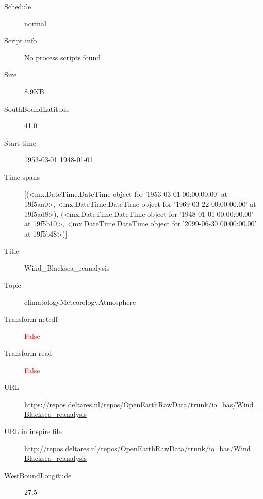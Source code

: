 \documentclass[9]{report}
\begin{document}
\begin{description}
\begin{verbatim}
\end{verbatim}
  \item[Schedule] normal
  \item[Script info] No process scripts found
  \item[Size] 8.9KB
  \item[SouthBoundLatitude] 41.0
  \item[Start time] 1953-03-01 1948-01-01
  \item[Time spans] [(<mx.DateTime.DateTime object for '1953-03-01 00:00:00.00' at 19f5aa0>, <mx.DateTime.DateTime object for '1969-03-22 00:00:00.00' at 19f5ad8>), (<mx.DateTime.DateTime object for '1948-01-01 00:00:00.00' at 19f5b10>, <mx.DateTime.DateTime object for '2099-06-30 00:00:00.00' at 19f5b48>)]
  \item[Title]  Wind\_Blacksea\_reanalysis 
  \item[Topic] climatologyMeteorologyAtmosphere
  \item[Transform netcdf] \textcolor{red}{False}
  \item[Transform read] \textcolor{red}{False}
  \item[URL] \href{https://repos.deltares.nl/repos/OpenEarthRawData/trunk/io\_bas/Wind\_Blacksea\_reanalysis}{https://repos.deltares.nl/repos/OpenEarthRawData/trunk/io\_bas/Wind\_Blacksea\_reanalysis}
  \item[URL in inspire file] \href{http://repos.deltares.nl/repos/OpenEarthRawData/trunk/io\_bas/Wind\_Blacksea\_reanalysis}{http://repos.deltares.nl/repos/OpenEarthRawData/trunk/io\_bas/Wind\_Blacksea\_reanalysis}
  \item[WestBoundLongitude] 27.5
\end{description}
\end{document}
